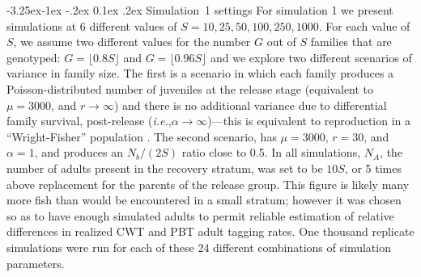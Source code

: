 \documentclass[11pt]{article}
\makeatletter
\newcommand{\ie}{{\em i.e.},\xspace }
\renewcommand\subsection{\@startsection{subsection}{2}{\z@}%
                                     {-3.25ex\@plus -1ex \@minus -.2ex}%
                                     {0.1ex \@plus .2ex}%
                                     {\normalfont\normalsize\bfseries}}
\makeatother
\begin{document}
\subsection{Simulation~1 settings}
For simulation 1 we present simulations at 6 different values of $S = 10, 25, 50, 100, 250, 1000$.  For each value of $S$,
we assume two different values for the number $G$ out of $S$ families that are genotyped: $G = \lfloor 0.8 S \rfloor$ and
$G = \lfloor 0.96 S \rfloor$ and 
we explore two different scenarios of variance in family size. The first is a scenario in which each family
produces a Poisson-distributed number of
juveniles at the release stage (equivalent to $\mu=3000$, and $r\rightarrow\infty$) and there is no
additional variance due to differential family 
survival, post-release (\ie $\alpha \rightarrow \infty$)---this is equivalent to reproduction in
a ``Wright-Fisher'' population \citep[][p. 102]{Har&Cla2007}. The second scenario, has
$\mu = 3000$, $r = 30$, and $\alpha = 1$, and produces an $N_b/(2S)$ ratio close to
0.5.  In all simulations, $N_A$, the number of adults present in the recovery stratum, was set to 
be $10S$, or 5 times above replacement for the parents of the release group. This figure is likely many more fish than would
be encountered in a small stratum; however it was chosen so as to have enough simulated adults to permit reliable estimation
of relative differences in realized CWT and PBT adult tagging rates. 
One thousand replicate simulations were run for each of these 24 different combinations of simulation parameters. 
\end{document}
